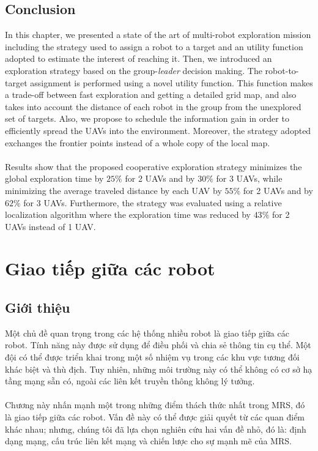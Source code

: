 \documentclass[11pt,openany]{book}
\begin{document}
\section{Conclusion}
In this chapter, we presented a state of the art of multi-robot exploration mission including the strategy used to assign a robot to a target and an utility function adopted to estimate the interest of reaching it. Then, we introduced an exploration strategy based on the group-\textit{leader} decision making. The robot-to-target assignment is performed using a novel utility function. This function makes a trade-off between fast exploration and getting a detailed grid map, and also takes into account the distance of each robot in the group from the unexplored set of targets. Also, we propose to schedule the information gain in order to eﬃciently spread the UAVs into the environment. Moreover, the strategy adopted exchanges the frontier points instead of a whole copy of the local map.\\\\
Results show that the proposed cooperative exploration strategy minimizes the global exploration time by $25\%$ for 2 UAVs and by $30\%$ for 3 UAVs, while minimizing the average traveled distance by each UAV by $55\%$ for 2 UAVs and by $62\%$ for 3 UAVs. Furthermore, the strategy was evaluated using a relative localization algorithm where the exploration time was reduced by $43\%$ for 2 UAVs instead of 1 UAV.
\chapter{Giao tiếp giữa các robot}
\section{Giới thiệu}
Một chủ đề quan trọng trong các hệ thống nhiều robot là giao tiếp giữa các robot. Tính năng này được sử dụng để điều phối và chia sẻ thông tin cụ thể. Một đội có thể được triển khai trong một số nhiệm vụ trong các khu vực tương đối khác biệt và thù địch. Tuy nhiên, những môi trường này có thể không có cơ sở hạ tầng mạng sẵn có, ngoài các liên kết truyền thông không lý tưởng.\\\\
Chương này nhấn mạnh một trong những điểm thách thức nhất trong MRS, đó là giao tiếp giữa các robot. Vấn đề này có thể được giải quyết từ các quan điểm khác nhau; nhưng, chúng tôi đã lựa chọn nghiên cứu hai vấn đề nhỏ, đó là: định dạng mạng, cấu trúc liên kết mạng và chiến lược cho sự mạnh mẽ của MRS.
\end{document}
